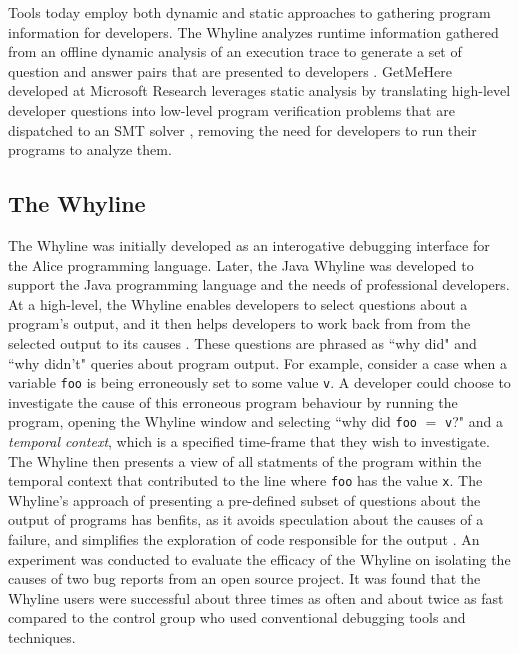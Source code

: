 \noindent Tools today employ both dynamic and static approaches to gathering
program information for developers.
The Whyline analyzes runtime information gathered from an offline dynamic
analysis of an execution trace to generate a set of question and answer pairs
that are presented to developers \cite{ko-2004-whyline}.
GetMeHere developed at Microsoft Research leverages static analysis by
translating high-level developer questions into low-level program verification 
problems that are dispatched to an \ac{SMT} solver \cite{barnett-2014-get}, 
removing the need for developers to run their programs to analyze them.

\subsection{The Whyline}
\label{subsec:TheWhyline}

\par The Whyline was initially developed as an interogative debugging interface
for the Alice programming language. Later, the Java Whyline was developed to 
support the Java programming language and the needs of professional developers.
At a high-level, the Whyline enables developers to select questions about a
program's output, and it then helps developers to work back from from the 
selected output to its causes \cite{ko-2009-java-whyline}.
These questions are phrased as ``why did" and ``why didn't"
queries about program output.
For example, consider a case when a variable \texttt{foo} is being erroneously 
set to some value \texttt{v}.
A developer could choose to investigate the cause of this erroneous program
behaviour by running the program, opening the Whyline window and selecting
``why did \texttt{foo} $=$ \texttt{v}?" and a \emph{temporal context}, which is
a specified time-frame that they wish to investigate.
The Whyline then presents a view of all statments of the program within the
temporal context that contributed to the line where \texttt{foo} has the value
\texttt{x}. 
The Whyline's approach of presenting a pre-defined subset of questions about the 
output of programs has benfits, as it avoids speculation about the causes of
a failure, and simplifies the exploration of code responsible for the output
\cite{ko-2009-java-whyline}.
An experiment was conducted to evaluate the efficacy of the Whyline on 
isolating the causes of two bug reports from an open source project.
It was found that the Whyline users were successful about three times as often
and about twice as fast compared to the control group who used conventional
debugging tools and techniques.

